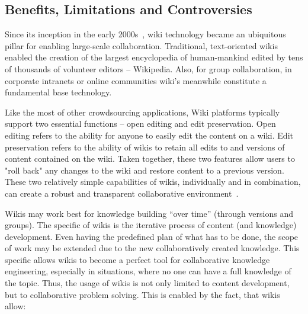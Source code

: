 \documentclass[ngerman,UKenglish,table]{scrbook}
\begin{document}
\subsection{Benefits, Limitations and Controversies}

Since its inception in the early 2000s~\cite{LeufCunningham2001}, wiki technology became an ubiquitous pillar for enabling large-scale collaboration.
Traditional, text-oriented wikis enabled the creation of the largest encyclopedia of human-mankind edited by tens of thousands of volunteer editors -- Wikipedia.
Also, for group collaboration, in corporate intranets or online communities wiki's meanwhile constitute a fundamental base technology.

Like the most of other crowdsourcing applications, Wiki platforms typically support two essential functions – open editing and edit preservation.
Open editing refers to the ability for anyone to easily edit the content on a wiki.
Edit preservation refers to the ability of wikis to retain all edits to and versions of content contained on the wiki.
Taken together, these two features allow users to "roll back" any changes to the wiki and restore content to a previous version.
These two relatively simple capabilities of wikis, individually and in combination, can create a robust and transparent collaborative environment~\cite{kane2009shoemaker}.

Wikis may work best for knowledge building “over time” (through
versions and groups).
The specific of wikis is the iterative process of content (and knowledge) development.
Even having the predefined plan of what has to be done, the scope of work may be extended due to the new collaboratively created knowledge. 
This specific allows wikis to become a perfect tool for collaborative knowledge engineering, especially in situations, where no one can have a full knowledge of the topic.
Thus, the usage of wikis is not only limited to content development, but to collaborative problem solving.
This is enabled by the fact, that wikis allow:
 
\end{document}
